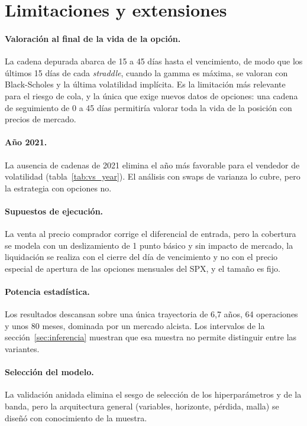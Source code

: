 \documentclass[11pt,a4paper]{article}
\begin{document}
\section{Limitaciones y extensiones}\label{sec:limitaciones}

\paragraph{Valoración al final de la vida de la opción.} La cadena depurada abarca de 15 a 45 días hasta el vencimiento, de modo que los últimos 15 días de cada \textit{straddle}, cuando la gamma es máxima, se valoran con Black-Scholes y la última volatilidad implícita. Es la limitación más relevante para el riesgo de cola, y la única que exige nuevos datos de opciones: una cadena de seguimiento de 0 a 45 días permitiría valorar toda la vida de la posición con precios de mercado.

\paragraph{Año 2021.} La ausencia de cadenas de 2021 elimina el año más favorable para el vendedor de volatilidad (tabla~\ref{tab:vs_year}). El análisis con swaps de varianza lo cubre, pero la estrategia con opciones no.

\paragraph{Supuestos de ejecución.} La venta al precio comprador corrige el diferencial de entrada, pero la cobertura se modela con un deslizamiento de 1 punto básico y sin impacto de mercado, la liquidación se realiza con el cierre del día de vencimiento y no con el precio especial de apertura de las opciones mensuales del SPX, y el tamaño es fijo.

\paragraph{Potencia estadística.} Los resultados descansan sobre una única trayectoria de 6,7 años, 64 operaciones y unos 80 meses, dominada por un mercado alcista. Los intervalos de la sección~\ref{sec:inferencia} muestran que esa muestra no permite distinguir entre las variantes.

\paragraph{Selección del modelo.} La validación anidada elimina el sesgo de selección de los hiperparámetros y de la banda, pero la arquitectura general (variables, horizonte, pérdida, malla) se diseñó con conocimiento de la muestra.
\end{document}
